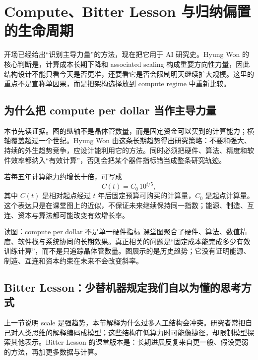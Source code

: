 \section{Compute、Bitter Lesson 与归纳偏置的生命周期}

开场已经给出“识别主导力量”的方法，现在把它用于 AI 研究史。Hyung Won 的核心判断是，计算成本长期下降和 associated scaling 构成重要方向性力量，因此结构设计不能只看今天是否更准，还要看它是否会限制明天继续扩大规模。这里的重点不是宣称单因果，而是把架构选择放到 compute regime 中重新比较。

\subsection{为什么把 compute per dollar 当作主导力量}

本节先读证据。图的纵轴不是晶体管数量，而是固定资金可以买到的计算能力；横轴覆盖超过一个世纪。Hyung Won 由这条长期趋势得出研究策略：不要和强大、持续的外生趋势竞争，应设计能利用它的方法。同时必须把硬件、算法、精度和软件效率都纳入“有效计算”，否则会把某个器件指标错当成整条研究轨迹。


若每五年计算能力约增长十倍，可写成
\[
C(t)=C_0\,10^{t/5},
\]
其中 $C(t)$ 是相对起点经过 $t$ 年后固定预算可购买的计算量，$C_0$ 是起点计算量。这个表达只是在课堂图上的近似，不保证未来继续保持同一指数；能源、制造、互连、资本与算法都可能改变有效增长率。

\begin{knowledgebox}{读图：compute per dollar 不是单一硬件指标}
课堂图聚合了硬件、算法、数值精度、软件栈与系统协同的长期效果。真正相关的问题是“固定成本能完成多少有效训练计算”，而不是只追踪晶体管数量。图展示的是历史趋势；它没有证明能源、制造、互连和资本约束在未来不会改变斜率。
\end{knowledgebox}


\subsection{Bitter Lesson：少替机器规定我们自以为懂的思考方式}

上一节说明 scale 是强趋势，本节解释为什么过多人工结构会冲突。研究者常把自己对人类思维的解释编码成模型；这些结构在低算力时可能像捷径，却限制模型探索其他表示。Bitter Lesson 的课堂版本是：长期进展反复来自更一般、假设更弱的方法，再加更多数据与计算。

